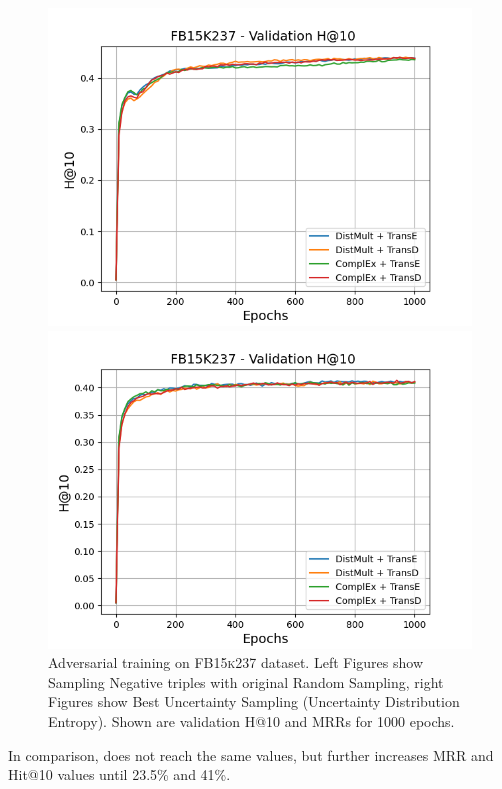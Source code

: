 \begin{figure}[H]
\begin{minipage}{.5\textwidth}
    \end{minipage}
    \begin{minipage}{.5\textwidth}
      \centering
      \includegraphics[width=0.9\linewidth]{figures/results/gan_train/not_pretrained/random/fb15k237/epochs1000/random_fb15k237_hit10.png}
    \end{minipage}%
    \begin{minipage}{.5\textwidth}
      \centering
      \includegraphics[width=0.9\linewidth]{figures/results/gan_train/not_pretrained/uncertainty/max_distribution/entropy/fb15k237/1k_epochs/uncertainty_fb15k237_hit10.png}
    \end{minipage}%
    \caption{Adversarial training on \textsc{FB15k237} dataset. 
    Left Figures show Sampling Negative triples with original Random Sampling, right Figures show Best Uncertainty Sampling (Uncertainty Distribution Entropy).
    Shown are validation H@10 and MRRs for 1000 epochs.}
    \label{fig:advtrain_fb15k237_random_vs_uncertainty}
\end{figure}
In comparison, \ussoftmax does not reach the same values, but further increases MRR and Hit@10 values until 23.5\% and 41\%.

